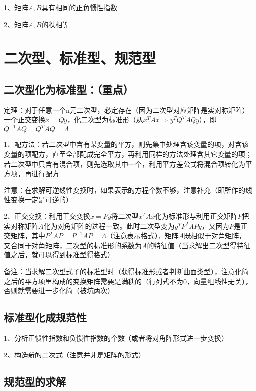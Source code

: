 1、矩阵$A,B$具有相同的正负惯性指数

2、矩阵$A,B$的秩相等

\section{二次型、标准型、规范型}



\subsection{二次型化为标准型：（重点）}

定理：对于任意一个n元二次型，必定存在（因为二次型对应矩阵是实对称矩阵）一个正交变换$x=Qy$，化二次型为标准形（从$x^TAx \Rightarrow y^TQ^TAQy$），即$Q^{-1}AQ=Q^TAQ=\Lambda$

1、配方法：若二次型中含有某变量的平方，则先集中处理含该变量的项，对含该变量的项配方，直至全部配成完全平方，再利用同样的方法处理含其它变量的项；若二次型中只含有混合项，则先选取其中一个，利用平方差公式将混合项转化为平方项，再进行配方

注意：在求解可逆线性变换时，如果表示的方程个数不够，注意补充（即所作的线性变换一定是可逆的）

2、正交变换：利用正交变换$x=Py$将二次型$x^TAx$化为标准形与利用正交矩阵$P$把实对称矩阵$A$化为对角矩阵的过程一致。此时二次型变为$y^TP^TAPy$，又因为$P$是正交矩阵，其中$P^TAP =P^{-1}AP= \Lambda$（注意表示格式），矩阵$A$既相似于对角矩阵，又合同于对角矩阵，二次型的标准形的系数为$A$的特征值（当求解出二次型得特征值之后，就可以得到标准型得格式）

备注：当求解二次型式子的标准型时（获得标准形或者判断曲面类型），注意化简之后的平方项里构成的变换矩阵需要是满秩的（行列式不为0，向量组线性无关），否则就需要进一步化简（被坑两次）



\subsection{标准型化成规范性}

1、分析正惯性指数和负惯性指数的个数（或者将对角阵形式进一步变换）

2、构造新的二次式（注意并非是矩阵的形式）



\subsection{规范型的求解}

